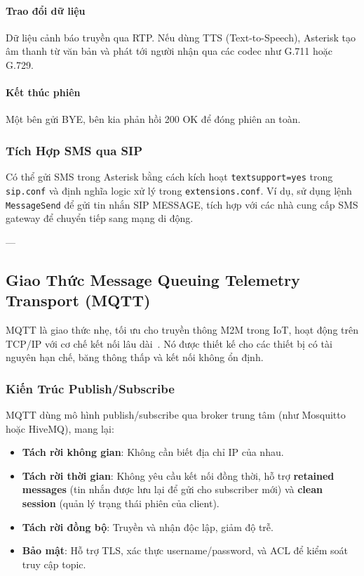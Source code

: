 \paragraph{Trao đổi dữ liệu}
Dữ liệu cảnh báo truyền qua RTP. Nếu dùng TTS (Text-to-Speech), Asterisk tạo âm thanh từ văn bản và phát tới người nhận qua các codec như G.711 hoặc G.729.

\paragraph{Kết thúc phiên}
Một bên gửi BYE, bên kia phản hồi 200 OK để đóng phiên an toàn.

\subsubsection{Tích Hợp SMS qua SIP}
\label{subsubsec:sip_sms}

Có thể gửi SMS trong Asterisk bằng cách kích hoạt \texttt{textsupport=yes} trong \texttt{sip.conf} và định nghĩa logic xử lý trong \texttt{extensions.conf}. Ví dụ, sử dụng lệnh \texttt{MessageSend} để gửi tin nhắn SIP MESSAGE, tích hợp với các nhà cung cấp SMS gateway để chuyển tiếp sang mạng di động.

---

\subsection{Giao Thức Message Queuing Telemetry Transport (MQTT)}
\label{subsec:mqtt_protocol}

MQTT là giao thức nhẹ, tối ưu cho truyền thông M2M trong IoT, hoạt động trên TCP/IP với cơ chế kết nối lâu dài~\cite{mqtt_oasis_standard}. Nó được thiết kế cho các thiết bị có tài nguyên hạn chế, băng thông thấp và kết nối không ổn định.

\subsubsection{Kiến Trúc Publish/Subscribe}
\label{subsubsec:mqtt_pubsub}

MQTT dùng mô hình publish/subscribe qua broker trung tâm (như Mosquitto hoặc HiveMQ), mang lại:
\begin{itemize}
\item \textbf{Tách rời không gian}: Không cần biết địa chỉ IP của nhau.
\item \textbf{Tách rời thời gian}: Không yêu cầu kết nối đồng thời, hỗ trợ \textbf{retained messages} (tin nhắn được lưu lại để gửi cho subscriber mới) và \textbf{clean session} (quản lý trạng thái phiên của client).
\item \textbf{Tách rời đồng bộ}: Truyền và nhận độc lập, giảm độ trễ.
\item \textbf{Bảo mật}: Hỗ trợ TLS, xác thực username/password, và ACL để kiểm soát truy cập topic.
\end{itemize}

